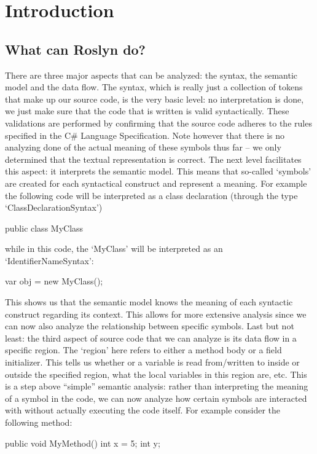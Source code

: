 \chapter{Introduction}
\label{ch:introduction}

\section{What can Roslyn do?}
\label{sec:intro-what}

There are three major aspects that can be analyzed: the syntax, the semantic model and the data flow. 
The syntax, which is really just a collection of tokens that make up our source code, is the very basic level: no interpretation is done, we just make sure that the code that is written is valid syntactically. These validations are performed by confirming that the source code adheres to the rules specified in the C\# Language Specification. Note however that there is no analyzing done of the actual meaning of these symbols thus far – we only determined that the textual representation is correct.
The next level facilitates this aspect: it interprets the semantic model. This means that so-called ‘symbols’ are created for each syntactical construct and represent a meaning. For example the following code will be interpreted as a class declaration (through the type ‘ClassDeclarationSyntax’)

   public class MyClass { }
	
while in this code, the ‘MyClass’ will be interpreted as an ‘IdentifierNameSyntax’:

   var obj = new MyClass();
	
This shows us that the semantic model knows the meaning of each syntactic construct regarding its context. This allows for more extensive analysis since we can now also analyze the relationship between specific symbols. 
Last but not least: the third aspect of source code that we can analyze is its data flow in a specific region. The ‘region’ here refers to either a method body or a field initializer. This tells us whether or a variable is read from/written to inside or outside the specified region, what the local variables in this region are, etc. This is a step above “simple” semantic analysis: rather than interpreting the meaning of a symbol in the code, we can now analyze how certain symbols are interacted with without actually executing the code itself.
For example consider the following method:

   public void MyMethod()
   {
      int x = 5;
      int y;
   }
	

